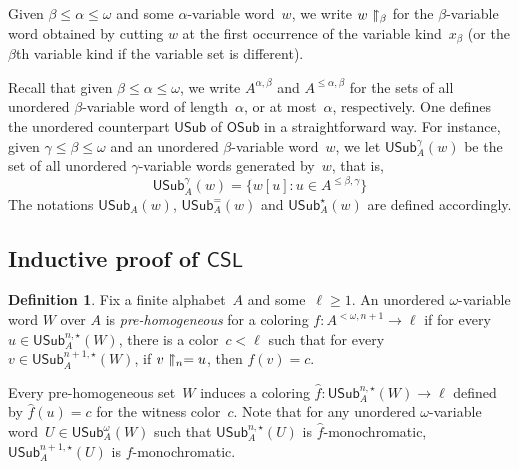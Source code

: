 \documentclass{article}
\newcommand{\CSL}[0]{\mathsf{CSL}}
\newcommand{\OSub}{\mathsf{OSub}}
\newcommand{\USub}{\mathsf{USub}}
\newcommand{\WSub}{\mathsf{WSub}}
\numberwithin{theorem}{section}
\theoremstyle{definition}
\newtheorem{definition}[theorem]{Definition}
\newcommand{\upupharpoonright}{%
  \upharpoonright
  \mathrel{\mkern-4.5mu}%
  \upharpoonright
}
\newcommand{\uuh}{\upupharpoonright}
\begin{document}
Given $\beta \leq \alpha \leq \omega$ and some $\alpha$-variable word~$w$, we write $w \uuh_\beta$ for the $\beta$-variable word obtained by cutting $w$ at the first occurrence of the variable kind~$x_\beta$ (or the $\beta$th variable kind if the variable set is different).

Recall that given $\beta \leq \alpha \leq \omega$, we write $A^{\alpha, \beta}$ and $A^{\leq\alpha, \beta}$ for the sets of all unordered $\beta$-variable word of length~$\alpha$, or at most~$\alpha$, respectively. One defines the unordered counterpart $\USub$ of $\OSub$ in a straightforward way. For instance, given $\gamma \leq \beta \leq \omega$ and an unordered $\beta$-variable word~$w$, we let $\USub^\gamma_{A}(w)$ be the set of all unordered $\gamma$-variable words generated by~$w$, that is,
$$
\USub^\gamma_{A}(w) =  \{ w[u] : u \in A^{\leq\beta, \gamma} \}
$$
The notations $\USub_A(w)$, $\USub^{=}_A(w)$ and $\USub^{\star}_A(w)$ are defined accordingly. %

\subsection{Inductive proof of $\CSL$}

\begin{definition}\label{def:csl-prehomogeneous}
Fix a finite alphabet~$A$ and some~$\ell \geq 1$.
An unordered $\omega$-variable word $W$ over $A$ is \emph{pre-homogeneous} for a coloring $f : A^{<\omega,n+1} \to \ell$ if for every $u \in \USub^{n,\star}_A(W)$, there is a color~$c < \ell$ such that for every~$v \in \USub^{n+1,\star}_A(W)$, if $v \uuh_n = u$, then $f(v) = c$.
\end{definition}

Every pre-homogeneous set~$W$ induces a coloring $\hat f : \USub^{n,\star}_A(W) \to \ell$ defined by $\hat f(u) = c$ for the witness color~$c$. Note that for any unordered $\omega$-variable word~$U \in \USub^\omega_A(W)$ such that $\USub^{n,\star}_A(U)$ is $\hat f$-monochromatic, $\USub^{n+1,\star}_A(U)$ is $f$-monochromatic.

\end{document}
